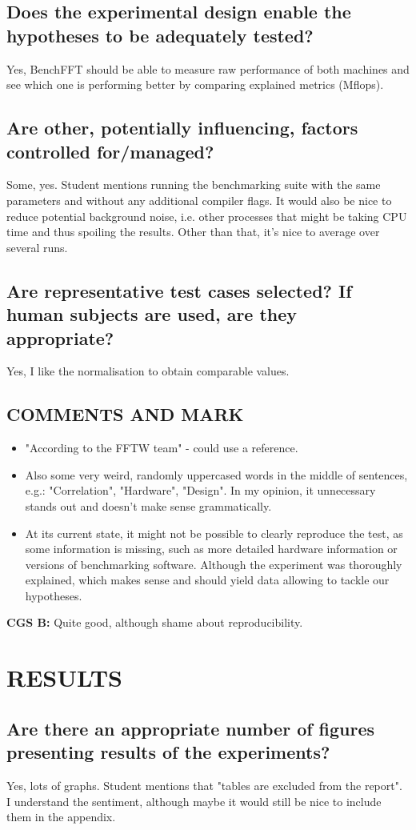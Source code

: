 \documentclass{article}
\begin{document}
\begin{normalsize}
\subsection{Does the experimental design enable the hypotheses to be adequately tested?}
Yes, BenchFFT should be able to measure raw performance of both machines and see which one is performing better by comparing explained metrics (Mflops).
\subsection{Are other, potentially influencing, factors controlled for/managed?}
Some, yes. Student mentions running the benchmarking suite with the same parameters and without any additional compiler flags. It would also be nice to reduce potential background noise, i.e. other processes that might be taking CPU time and thus spoiling the results.
\bigbreak\noindent
Other than that, it's nice to average over several runs.
\subsection{Are representative test cases selected?  If human subjects are used, are they appropriate?}
Yes, I like the normalisation to obtain comparable values. 
\subsection{COMMENTS AND MARK}
\begin{itemize}
\item "According to the FFTW team" - could use a reference.
\item Also some very weird, randomly uppercased words in the middle of sentences, e.g.: "Correlation", "Hardware", "Design". In my opinion, it unnecessary stands out and doesn't make sense grammatically.
\item At its current state, it might not be possible to clearly reproduce the test, as some information is missing, such as more detailed hardware information or versions of benchmarking software. Although the experiment was thoroughly explained, which makes sense and should yield data allowing to tackle our hypotheses.
\end{itemize}
\bigbreak\noindent
  \textbf{CGS B: }Quite good, although shame about reproducibility.
\section{RESULTS}
\subsection{Are there an appropriate number of figures presenting results of the experiments?}
Yes, lots of graphs.
\bigbreak\noindent
Student mentions that "tables are excluded from the report". I understand the sentiment, although maybe it would still be nice to include them in the appendix.

\end{normalsize}
\end{document}
